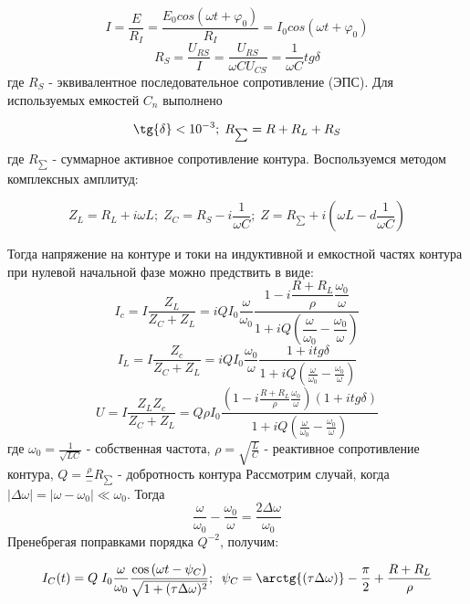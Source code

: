 \documentclass{article}
\begin{document}
\begin{equation}
    I=\dfrac{E}{R_I}=\dfrac{E_0cos(\omega t+\varphi_0)}{R_I}=I_0cos(\omega t+\varphi_0)
\end{equation}
\begin{equation*}
    R_S=\dfrac{U_{RS}}{I}=\frac{U_{RS}}{\omega CU_{CS}}=\dfrac{1}{\omega C}tg\delta
\end{equation*}
где $R_S$ - эквивалентное последовательное сопротивление (ЭПС). Для используемых емкостей $C_n$ выполнено

\begin{equation*}
    \tg{\delta}<10^{-3} ; \; R_{\sum}=R+R_L+R_S
\end{equation*}
где $R_{\sum}$ - суммарное активное сопротивление контура.\newline
Воспользуемся методом комплексных амплитуд:

\begin{equation}
    Z_L=R_L+i\omega L; \; Z_C=R_S-i\frac{1}{\omega C}; \; Z=R_{\sum}+i\left(\omega L-d\dfrac{1}{\omega C}\right)    
\end{equation}

Тогда напряжение на контуре и токи на индуктивной и емкостной частях контура при нулевой начальной фазе можно предствить в виде:\newline
$$I_c=I\dfrac{Z_L}{Z_C+Z_L}=iQI_0\dfrac{\omega}{\omega_0}\dfrac{1-i\dfrac{R+R_L}{\rho}\dfrac{\omega_0}{\omega}}{1+iQ(\dfrac{\omega}{\omega_0}-\dfrac{\omega_0}{\omega})}$$
$$I_L=I\dfrac{Z_c}{Z_C+Z_L}=iQI_0\frac{\omega_0}{\omega}\frac{1+itg\delta}{1+iQ(\frac{\omega}{\omega_0}-\frac{\omega_0}{\omega})}$$
$$U=I\frac{Z_LZ_c}{Z_C+Z_L}=Q\rho I_0\frac{(1-i\frac{R+R_L}{\rho}\frac{\omega_0}{\omega})(1+itg\delta)}{1+iQ(\frac{\omega}{\omega_0}-\frac{\omega_0}{\omega})}$$
где $\omega_0=\frac{1}{\sqrt{LC}}$ - собственная частота, $\rho=\sqrt{\frac{L}{C}}$ - реактивное сопротивление контура, $Q=\frac{\rho} - {R_{\sum}}$ - добротность контура\newline
Рассмотрим случай, когда $|\Delta\omega|=|\omega-\omega_0|\ll\omega_0$. Тогда
\begin{equation}
    \frac{\omega}{\omega_0}-\frac{\omega_0}{\omega}=\frac{2\Delta\omega}{\omega_0}
\end{equation}
Пренебрегая поправками порядка $Q^{-2}$, получим:

\begin{equation}
    I_{C}(t) = Q\;I_{0}\frac{\omega}{\omega_{0}}\frac{\cos{(\omega t - \psi_{C}})}{\sqrt{1 + (\tau \Delta \omega)^{2}}}; \; \;  \psi_{C} = \arctg{(\tau \Delta \omega)} - \frac{\pi}{2} + \frac{R + R_{L}}{\rho}
\end{equation}
\end{document}

